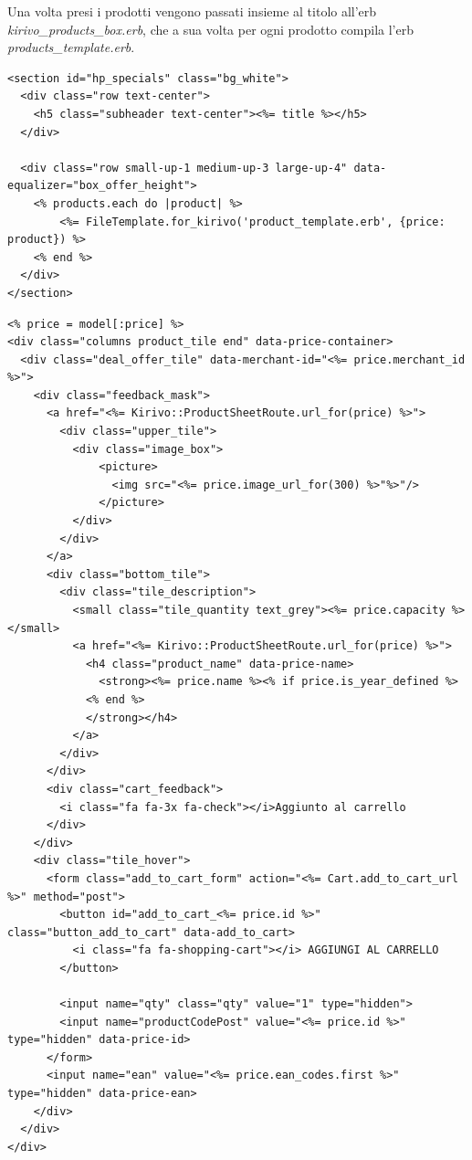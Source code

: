 Una volta presi i prodotti vengono passati insieme al titolo all'erb \emph{kirivo\_products\_box.erb}, che a sua volta per ogni prodotto
compila l'erb \emph{products\_template.erb}.
\newpage
\begin{lstlisting}[basicstyle=\tiny,caption={Il template \emph{kirivo\_products\_box.erb}}] 
<section id="hp_specials" class="bg_white">
  <div class="row text-center">
    <h5 class="subheader text-center"><%= title %></h5>
  </div>

  <div class="row small-up-1 medium-up-3 large-up-4" data-equalizer="box_offer_height">
    <% products.each do |product| %>
        <%= FileTemplate.for_kirivo('product_template.erb', {price: product}) %>
    <% end %>
  </div>
</section>
\end{lstlisting}
\begin{lstlisting}[basicstyle=\tiny, caption={Il template \emph{products\_template.erb}}] 
<% price = model[:price] %>
<div class="columns product_tile end" data-price-container>
  <div class="deal_offer_tile" data-merchant-id="<%= price.merchant_id %>">
    <div class="feedback_mask">
      <a href="<%= Kirivo::ProductSheetRoute.url_for(price) %>">
        <div class="upper_tile">
          <div class="image_box">
              <picture>
                <img src="<%= price.image_url_for(300) %>"%>"/>
              </picture>
          </div>
        </div>
      </a>
      <div class="bottom_tile">
        <div class="tile_description">
          <small class="tile_quantity text_grey"><%= price.capacity %></small>
          <a href="<%= Kirivo::ProductSheetRoute.url_for(price) %>">
            <h4 class="product_name" data-price-name>
              <strong><%= price.name %><% if price.is_year_defined %>
            <% end %>
            </strong></h4>
          </a>
        </div>
      </div>
      <div class="cart_feedback">
        <i class="fa fa-3x fa-check"></i>Aggiunto al carrello
      </div>
    </div>
    <div class="tile_hover">
      <form class="add_to_cart_form" action="<%= Cart.add_to_cart_url %>" method="post">
        <button id="add_to_cart_<%= price.id %>" class="button_add_to_cart" data-add_to_cart>
          <i class="fa fa-shopping-cart"></i> AGGIUNGI AL CARRELLO
        </button>

        <input name="qty" class="qty" value="1" type="hidden">
        <input name="productCodePost" value="<%= price.id %>" type="hidden" data-price-id>
      </form>
      <input name="ean" value="<%= price.ean_codes.first %>" type="hidden" data-price-ean>
    </div>
  </div>
</div>
\end{lstlisting}


